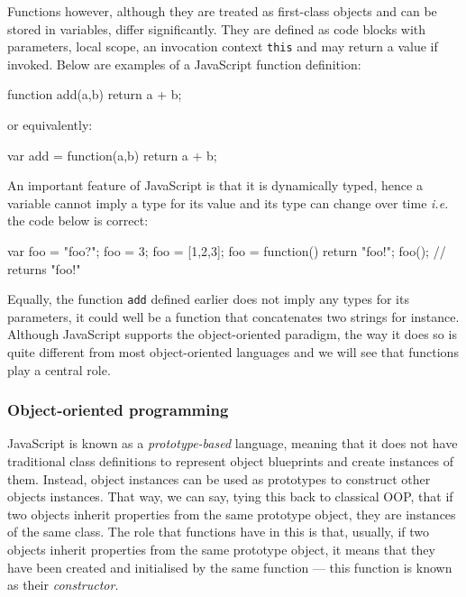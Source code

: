 Functions however, although they are treated as first-class objects and can be stored in variables, differ significantly. They are defined as code blocks with parameters, local scope, an invocation context \texttt{this} and may return a value if invoked. Below are examples of a JavaScript function definition:

\begin{code}
function add(a,b) {
    return a + b;
}
\end{code}
\newline or equivalently:

\begin{code}[caption=JavaScript function definitions,label=jsfunctions]
var add = function(a,b) {
    return a + b;
}
\end{code}

An important feature of JavaScript is that it is dynamically typed, hence a variable cannot imply a type for its value and its type can change over time \emph{i.e.} the code below is correct:

\begin{code}[caption=JavaScript dynamic types,label=jstypes]
var foo = "foo?";
foo = 3;
foo = [1,2,3];
foo = function() {return "foo!"};
foo(); // returns "foo!"
\end{code}

Equally, the function \texttt{add} defined earlier does not imply any types for its parameters, it could well be a function that concatenates two strings for instance. Although JavaScript supports the object-oriented paradigm, the way it does so is quite different from most object-oriented languages and we will see that functions play a central role.

\subsubsection{Object-oriented programming}
\label{js}

JavaScript is known as a \emph{prototype-based} language, meaning that it does not have traditional class definitions to represent object blueprints and create instances of them. Instead, object instances can be used as prototypes to construct other objects instances. That way, we can say, tying this back to classical OOP, that if two objects inherit properties from the same prototype object, they are instances of the same class. The role that functions have in this is that, usually, if two objects inherit properties from the same prototype object, it means that they have been created and initialised by the same function --- this function is known as their \emph{constructor}.

